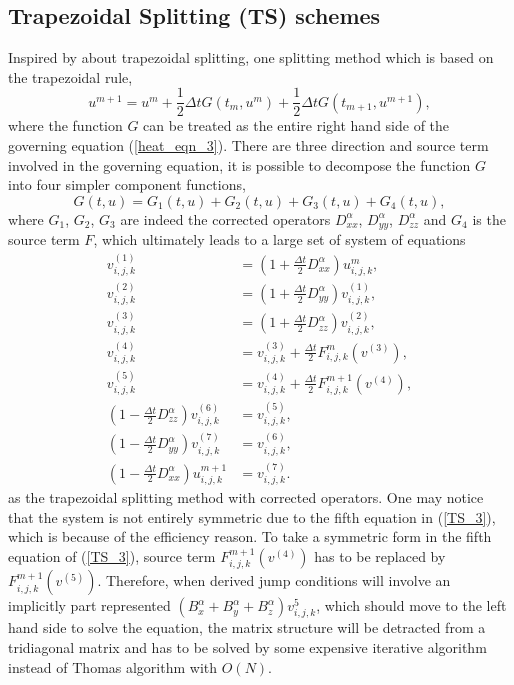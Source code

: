 \documentclass[dissertation]{uathesis}
\begin{document}
\begin{body}
\subsection{Trapezoidal Splitting (TS) schemes}
Inspired by \cite{hundsdorfer1998trapezoidal} about trapezoidal splitting, one splitting method which is based on the trapezoidal rule,
%
\begin{equation} \label{Trapezoidal_rule_3}
u^{m+1} = u^{m} + \frac{1}{2} \Delta t G(t_m, u^m) + \frac{1}{2} \Delta t G(t_{m+1}, u^{m+1}), 
\end{equation}
%
where the function $G$ can be treated as the entire right hand side of the governing equation (\ref{heat_eqn_3}). There are three direction and source term involved in the governing equation, it is possible to decompose the function $G$ into four simpler component functions, 
%
\begin{equation} \label{decompose_G_3}
G(t, u) = G_1(t, u) + G_2(t, u) + G_3(t, u) + G_4(t, u), 
\end{equation}
%
where $G_1$, $G_2$, $G_3$ are indeed the corrected operators $D^{\alpha}_{xx}$, $D^{\alpha}_{yy}$, $D^{\alpha}_{zz}$ and $G_4$ is the source term $F$, which ultimately leads to a large set of system of equations
%
\begin{align} \label{TS_3}
v^{(1)}_{i,j,k} &= (1+\frac{\Delta t}{2} D^{\alpha}_{xx})u^{m}_{i,j,k}, \nonumber \\
v^{(2)}_{i,j,k} &= (1+\frac{\Delta t}{2} D^{\alpha}_{yy})v^{(1)}_{i,j,k}, \nonumber \\
v^{(3)}_{i,j,k} &= (1+\frac{\Delta t}{2} D^{\alpha}_{zz})v^{(2)}_{i,j,k}, \nonumber \\
v^{(4)}_{i,j,k} &= v^{(3)}_{i,j,k} + \frac{\Delta t}{2} F^{m}_{i,j,k}(v^{(3)}), \nonumber \\
v^{(5)}_{i,j,k} &= v^{(4)}_{i,j,k} + \frac{\Delta t}{2} F^{m+1}_{i,j,k}(v^{(4)}), \\
(1-\frac{\Delta t}{2} D^{\alpha}_{zz})v^{(6)}_{i,j,k} &= v^{(5)}_{i,j,k}, \nonumber \\
(1-\frac{\Delta t}{2} D^{\alpha}_{yy})v^{(7)}_{i,j,k} &= v^{(6)}_{i,j,k}, \nonumber \\
(1-\frac{\Delta t}{2} D^{\alpha}_{xx})u^{m+1}_{i,j,k} &= v^{(7)}_{i,j,k}. \nonumber
\end{align}
%
as the trapezoidal splitting method with corrected operators. One may notice that the system is not entirely symmetric due to the fifth equation in (\ref{TS_3}), which is because of the efficiency reason. To take a symmetric form in the fifth equation of (\ref{TS_3}), source term $F^{m+1}_{i,j,k}(v^{(4)})$ has to be replaced by $F^{m+1}_{i,j,k}(v^{(5)})$. Therefore, when derived jump conditions will involve an implicitly part represented $(B^{\alpha}_{x}+B^{\alpha}_{y}+B^{\alpha}_{z})v^{5}_{i,j,k}$, which should move to the left hand side to solve the equation, the matrix structure will be detracted from a tridiagonal matrix and has to be solved by some expensive iterative algorithm instead of Thomas algorithm with $O(N)$.


\end{body}
\end{document}
